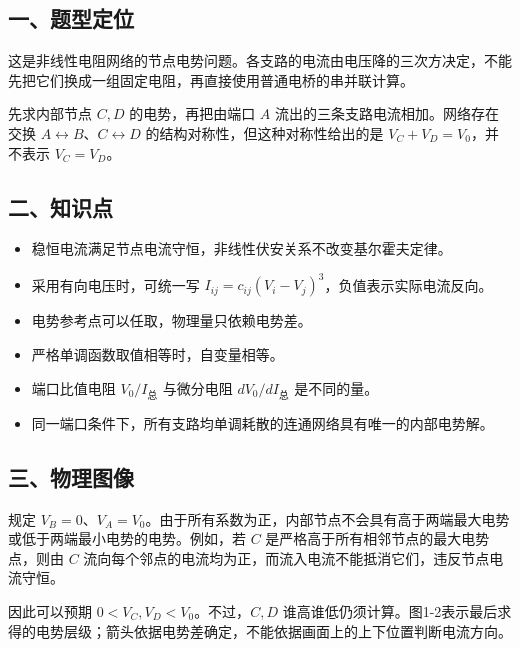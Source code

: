 \documentclass[12pt,a4paper,fontset=fandol]{ctexart}
\providecommand{\tightlist}{\setlength{\itemsep}{0pt}\setlength{\parskip}{0pt}}
\begin{document}
\subsection{一、题型定位}\label{ux4e00ux9898ux578bux5b9aux4f4d}

这是非线性电阻网络的节点电势问题。各支路的电流由电压降的三次方决定，不能先把它们换成一组固定电阻，再直接使用普通电桥的串并联计算。

先求内部节点 \(C,D\) 的电势，再把由端口 \(A\)
流出的三条支路电流相加。网络存在交换
\(A\leftrightarrow B\)、\(C\leftrightarrow D\)
的结构对称性，但这种对称性给出的是 \(V_C+V_D=V_0\)，并不表示
\(V_C=V_D\)。

\subsection{二、知识点}\label{ux4e8cux77e5ux8bc6ux70b9}

\begin{itemize}
\tightlist
\item
  稳恒电流满足节点电流守恒，非线性伏安关系不改变基尔霍夫定律。
\item
  采用有向电压时，可统一写
  \(I_{ij}=c_{ij}(V_i-V_j)^3\)，负值表示实际电流反向。
\item
  电势参考点可以任取，物理量只依赖电势差。
\item
  严格单调函数取值相等时，自变量相等。
\item
  端口比值电阻 \(V_0/I_{\text{总}}\) 与微分电阻 \(dV_0/dI_{\text{总}}\)
  是不同的量。
\item
  同一端口条件下，所有支路均单调耗散的连通网络具有唯一的内部电势解。
\end{itemize}

\subsection{三、物理图像}\label{ux4e09ux7269ux7406ux56feux50cf}

规定
\(V_B=0\)、\(V_A=V_0\)。由于所有系数为正，内部节点不会具有高于两端最大电势或低于两端最小电势的电势。例如，若
\(C\) 是严格高于所有相邻节点的最大电势点，则由 \(C\)
流向每个邻点的电流均为正，而流入电流不能抵消它们，违反节点电流守恒。

因此可以预期 \(0<V_C,V_D<V_0\)。不过，\(C,D\)
谁高谁低仍须计算。图1-2表示最后求得的电势层级；箭头依据电势差确定，不能依据画面上的上下位置判断电流方向。
\end{document}
